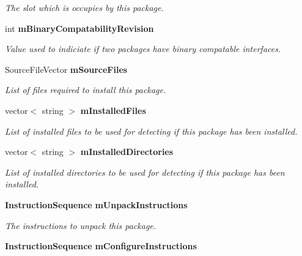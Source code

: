 \begin{DoxyCompactItemize}
\begin{DoxyCompactList}\small\item\em The slot which is occupies by this package. \item\end{DoxyCompactList}\item 
int {\bf mBinaryCompatabilityRevision}\label{classPackage_a6d35c8de847bf3a87fec97d231f3039d}

\begin{DoxyCompactList}\small\item\em Value used to indiciate if two packages have binary compatable interfaces. \item\end{DoxyCompactList}\item 
SourceFileVector {\bf mSourceFiles}\label{classPackage_ae1587b6f783efb4c8dd72ef089635c4c}

\begin{DoxyCompactList}\small\item\em List of files required to install this package. \item\end{DoxyCompactList}\item 
vector$<$ string $>$ {\bf mInstalledFiles}\label{classPackage_a2636c6f4885503b66bcf0aa7c5ac2ea6}

\begin{DoxyCompactList}\small\item\em List of installed files to be used for detecting if this package has been installed. \item\end{DoxyCompactList}\item 
vector$<$ string $>$ {\bf mInstalledDirectories}\label{classPackage_a183b07f0650b5025bd729b6942fd9c91}

\begin{DoxyCompactList}\small\item\em List of installed directories to be used for detecting if this package has been installed. \item\end{DoxyCompactList}\item 
{\bf InstructionSequence} {\bf mUnpackInstructions}\label{classPackage_a810829913a38d2bef23887943c4f993a}

\begin{DoxyCompactList}\small\item\em The instructions to unpack this package. \item\end{DoxyCompactList}\item 
{\bf InstructionSequence} {\bf mConfigureInstructions}\label{classPackage_aba60173b15195179fe36abc035f7525f}


\end{DoxyCompactItemize}
